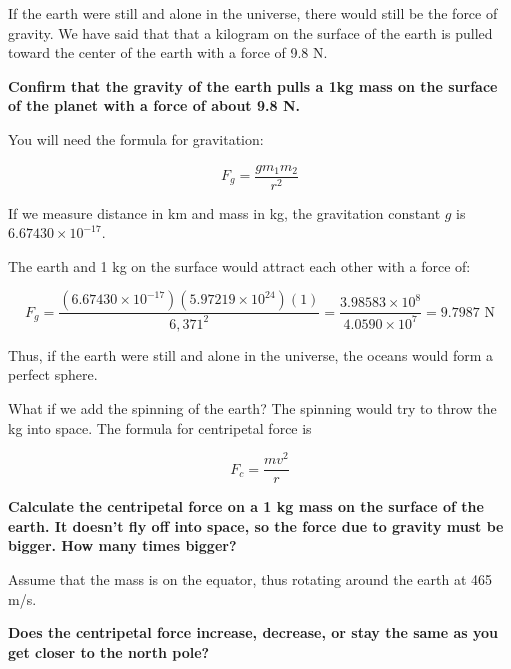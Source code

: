 \begin{Exercise}[title={Life Among the Orbits 1: Earth Gravity}, label=life-orbits1]


If the earth were still and alone in the universe,  there would still be the force of gravity.  We have said that that a kilogram on the surface of the earth is pulled toward the center of the earth with a force of 9.8 N.   

\textbf{Confirm that the gravity of the earth pulls a 1kg mass on the surface of the planet with a force of about 9.8 N.}

You will need the formula for gravitation: 

$$F_g = \frac{g m_1 m_2}{r^2}$$

If we measure distance in km and mass in kg,  the gravitation constant $g$ is $6.67430 \times 10^{-17}$.  

\end{Exercise}
\begin{Answer}[ref=life-orbits1]

The earth and 1 kg on the surface would attract each other with a force of:

$$F_g = \frac{\left( 6.67430 \times 10^{-17} \right) \left(5.97219 \times 10^{24}\right) \left(1\right)}{6,371^2} =  
\frac{3.98583 \times 10^{8}}{4.0590 \times 10^{7}}  = 9.7987 \text{ N}$$

Thus, if the earth were still and alone in the universe,  the oceans would form a perfect sphere.

\end{Answer}

\begin{Exercise}[title={Life Among the Orbits 2: Earth Centripetal Force}, label=life-orbits2]

What if we add the spinning of the earth?  The spinning would try to throw the kg into space.  The 
formula for centripetal force is

$$F_c = \frac{m v^2}{r} $$

\textbf{Calculate the centripetal force on a 1 kg mass on the surface of the earth.   It doesn't fly off into space,  so the force due to gravity must be bigger.  How many times bigger?}

Assume that the mass is on the equator,  thus rotating around the earth at 465 m/s.

\textbf{Does the centripetal force increase, decrease, or stay the same as you get closer to the north pole?}

\end{Exercise}

